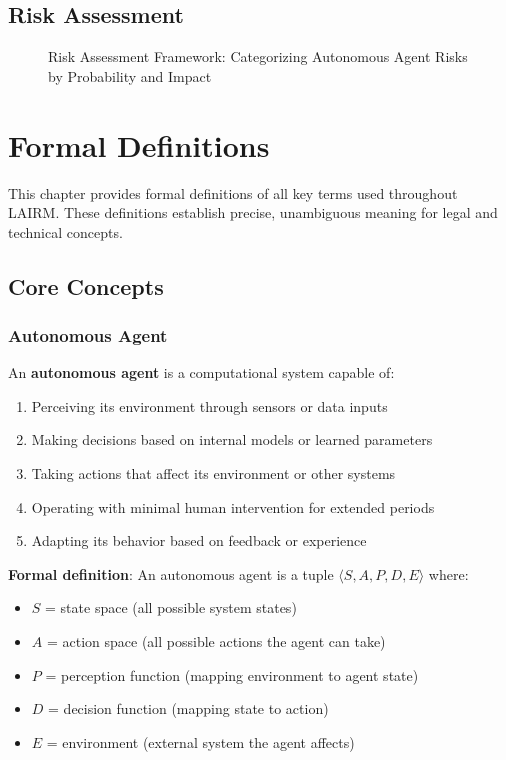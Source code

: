 \documentclass[12pt,a4paper,twoside,openright]{book}
\begin{document}
\vspace{0.5cm}

\section{Risk Assessment}

\begin{figure}[h]
\centering

\caption{Risk Assessment Framework: Categorizing Autonomous Agent Risks by Probability and Impact}
\label{fig:risk-assessment}
\end{figure}

\chapter{Formal Definitions}
\label{ch:definitions}

This chapter provides formal definitions of all key terms used throughout LAIRM. These definitions establish precise, unambiguous meaning for legal and technical concepts.

\section{Core Concepts}

\subsection{Autonomous Agent}

An \textbf{autonomous agent} is a computational system capable of:
\begin{enumerate}
    \item Perceiving its environment through sensors or data inputs
    \item Making decisions based on internal models or learned parameters
    \item Taking actions that affect its environment or other systems
    \item Operating with minimal human intervention for extended periods
    \item Adapting its behavior based on feedback or experience
\end{enumerate}

\textbf{Formal definition}: An autonomous agent is a tuple $\langle S, A, P, D, E \rangle$ where:
\begin{itemize}
    \item $S$ = state space (all possible system states)
    \item $A$ = action space (all possible actions the agent can take)
    \item $P$ = perception function (mapping environment to agent state)
    \item $D$ = decision function (mapping state to action)
    \item $E$ = environment (external system the agent affects)
\end{itemize}
\end{document}
